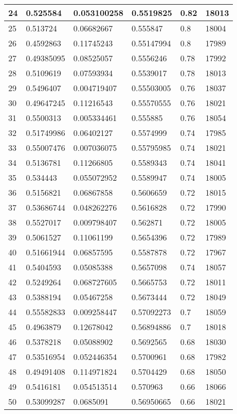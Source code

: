 \begin{longtable}{|l|l|l|l|l|l|}
24 & 0.525584 & 0.053100258 & 0.5519825 & 0.82 & 18013 \\ \hline 
25 & 0.513724 & 0.06682667 & 0.555847 & 0.8 & 18004 \\ \hline 
26 & 0.4592863 & 0.11745243 & 0.55147994 & 0.8 & 17989 \\ \hline 
27 & 0.49385095 & 0.08525057 & 0.5556246 & 0.78 & 17992 \\ \hline 
28 & 0.5109619 & 0.07593934 & 0.5539017 & 0.78 & 18013 \\ \hline 
29 & 0.5496407 & 0.004719407 & 0.55503005 & 0.76 & 18037 \\ \hline 
30 & 0.49647245 & 0.11216543 & 0.55570555 & 0.76 & 18021 \\ \hline 
31 & 0.5500313 & 0.005334461 & 0.555885 & 0.76 & 18054 \\ \hline 
32 & 0.51749986 & 0.06402127 & 0.5574999 & 0.74 & 17985 \\ \hline 
33 & 0.55007476 & 0.007036075 & 0.55795985 & 0.74 & 18021 \\ \hline 
34 & 0.5136781 & 0.11266805 & 0.5589343 & 0.74 & 18041 \\ \hline 
35 & 0.534443 & 0.055072952 & 0.5589947 & 0.74 & 18005 \\ \hline 
36 & 0.5156821 & 0.06867858 & 0.5606659 & 0.72 & 18015 \\ \hline 
37 & 0.53686744 & 0.048262276 & 0.5616828 & 0.72 & 17990 \\ \hline 
38 & 0.5527017 & 0.009798407 & 0.562871 & 0.72 & 18005 \\ \hline 
39 & 0.5061527 & 0.11061199 & 0.5654396 & 0.72 & 17989 \\ \hline 
40 & 0.51661944 & 0.06857595 & 0.5587878 & 0.72 & 17967 \\ \hline 
41 & 0.5404593 & 0.05085388 & 0.5657098 & 0.74 & 18057 \\ \hline 
42 & 0.5249264 & 0.068727605 & 0.5665753 & 0.72 & 18011 \\ \hline 
43 & 0.5388194 & 0.05467258 & 0.5673444 & 0.72 & 18049 \\ \hline 
44 & 0.55582833 & 0.009258447 & 0.57092273 & 0.7 & 18059 \\ \hline 
45 & 0.4963879 & 0.12678042 & 0.56894886 & 0.7 & 18018 \\ \hline 
46 & 0.5378218 & 0.05088902 & 0.5692565 & 0.68 & 18030 \\ \hline 
47 & 0.53516954 & 0.052446354 & 0.5700961 & 0.68 & 17982 \\ \hline 
48 & 0.49491408 & 0.114971824 & 0.5704429 & 0.68 & 18050 \\ \hline 
49 & 0.5416181 & 0.054513514 & 0.570963 & 0.66 & 18066 \\ \hline 
50 & 0.53099287 & 0.0685091 & 0.56950665 & 0.66 & 18021 \\ \hline 
\end{longtable}